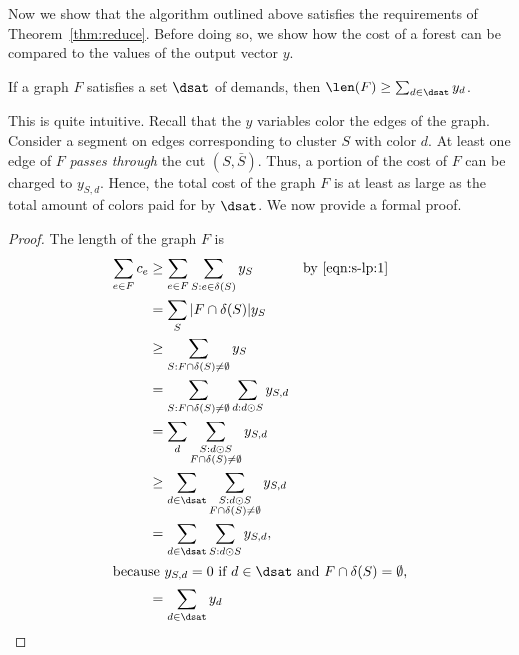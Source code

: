 Now we show that the algorithm  outlined above  satisfies the requirements
of Theorem~\ref{thm:reduce}.  Before doing so, we show how the cost of
a forest can be compared to the values of the output vector $y$.
\begin{lemma}\label{lem:coloring}
If a graph $F$ satisfies a set $\dsat$ of demands,
then $\len(F) \geq \sum_{d\in\dsat} y_d$.
\end{lemma}
This is quite intuitive.
Recall that the $y$ variables color the edges of the graph.
Consider a segment on edges corresponding to cluster $S$ with color $d$.
At least one edge of $F$ \emph{passes through} the cut $(S,\bar{S})$.
Thus, a portion of the cost of $F$ can be charged to $y_{S,d}$.
Hence, the total cost of the graph $F$ is at least as large as 
the total amount of colors paid for by $\dsat$.
We now provide a formal proof.
\begin{proof}
The length of the graph $F$ is
\begin{align*}
 \sum_{e\in F} c_e
  &\geq  \sum_{e\in F}\sum_{S: e\in\delta(S)} y_S &\text{by \eqref{eqn:s-lp:1}}\\
  &=     \sum_S |F \cap \delta(S)|y_S \\
  &\geq  \sum_{S: F \cap \delta(S)\neq\emptyset} y_S \\
  &=     \sum_{S: F\cap\delta(S)\neq\emptyset}\sum_{d: d\odot S} y_{S,d} \\
  &=     \sum_{d}\sum_{\substack{S: d\odot S\\F\cap\delta(S)\neq\emptyset}} y_{S,d} \\
  &\geq  \sum_{d\in \dsat}\sum_{\substack{S: d\odot S\\F\cap\delta(S)\neq\emptyset}} y_{S,d} \\
  &=     \sum_{d\in \dsat}\sum_{S: d\odot S} y_{S,d}, \\\intertext{because $y_{S,d}=0$ if $d\in \dsat$ and $F\cap\delta(S)=\emptyset$,}
  &=     \sum_{d\in \dsat} y_d  &\qedhere
\end{align*}
\end{proof}





